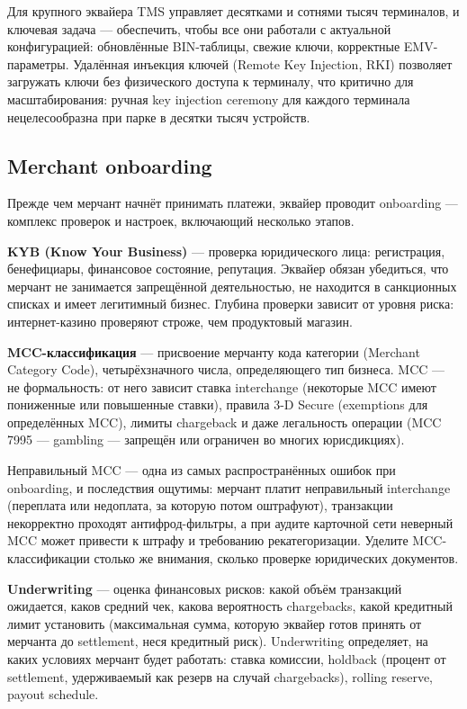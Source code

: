 Для крупного эквайера TMS управляет десятками и сотнями тысяч
терминалов, и ключевая задача — обеспечить, чтобы все они
работали с актуальной конфигурацией: обновлённые BIN-таблицы,
свежие ключи, корректные EMV-параметры. Удалённая инъекция
ключей (Remote Key Injection, RKI) позволяет загружать ключи
без физического доступа к терминалу, что критично
для масштабирования: ручная key injection ceremony
для каждого терминала нецелесообразна при парке в десятки
тысяч устройств.

\subsection*{Merchant onboarding}

Прежде чем мерчант начнёт принимать платежи, эквайер проводит
onboarding — комплекс проверок и настроек, включающий
несколько этапов.

\textbf{KYB (Know Your Business)} — проверка юридического лица:
регистрация, бенефициары, финансовое состояние, репутация.
Эквайер обязан убедиться, что мерчант не занимается запрещённой
деятельностью, не находится в санкционных списках и имеет
легитимный бизнес. Глубина проверки зависит от уровня риска:
интернет-казино проверяют строже, чем продуктовый магазин.

\textbf{MCC-классификация} — присвоение мерчанту кода
категории (Merchant Category Code), четырёхзначного числа,
определяющего тип бизнеса. MCC — не формальность:
от него зависит ставка interchange (некоторые MCC имеют
пониженные или повышенные ставки), правила 3-D Secure
(exemptions для определённых MCC), лимиты chargeback
и даже легальность операции (MCC 7995 — gambling —
запрещён или ограничен во многих юрисдикциях).

\begin{kaobox}[title=На практике]
  Неправильный MCC — одна из самых распространённых ошибок
  при onboarding, и последствия ощутимы: мерчант платит
  неправильный interchange (переплата или недоплата,
  за которую потом оштрафуют), транзакции некорректно
  проходят антифрод-фильтры, а при аудите карточной сети
  неверный MCC может привести к штрафу и требованию
  рекатегоризации. Уделите MCC-классификации столько же
  внимания, сколько проверке юридических документов.
\end{kaobox}

\textbf{Underwriting} — оценка финансовых рисков: какой объём
транзакций ожидается, каков средний чек, какова вероятность
chargebacks, какой кредитный лимит установить (максимальная
сумма, которую эквайер готов принять от мерчанта до settlement,
неся кредитный риск). Underwriting определяет, на каких
условиях мерчант будет работать: ставка комиссии, holdback
(процент от settlement, удерживаемый как резерв на случай
chargebacks), rolling reserve, payout schedule.

